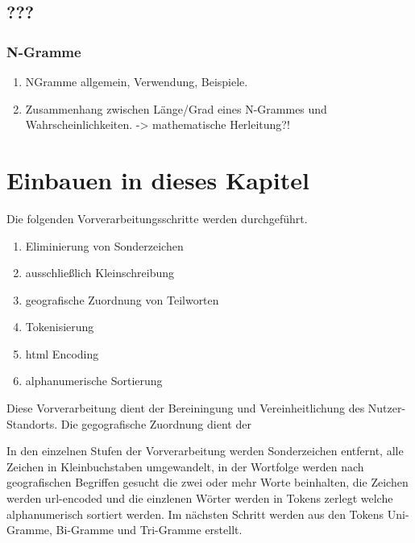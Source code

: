 		\subsubsection{}	

	\subsection{???} 
		\subsubsection{N-Gramme}
			\begin{enumerate}
				\item NGramme allgemein, Verwendung, Beispiele. 
				\item {} Zusammenhang zwischen Länge/Grad eines N-Grammes und Wahrscheinlichkeiten. -> mathematische Herleitung?!
			\end{enumerate}




\section{Einbauen in dieses Kapitel}

Die folgenden Vorverarbeitungsschritte werden durchgeführt.

	\begin{enumerate}
		\item Eliminierung von Sonderzeichen
		\item ausschließlich Kleinschreibung
		\item geografische Zuordnung von Teilworten  	
		\item Tokenisierung
		\item html Encoding
		\item alphanumerische Sortierung 
	\end{enumerate}

	Diese Vorverarbeitung dient der Bereiningung und Vereinheitlichung des Nutzer-Standorts.  
	Die gegografische Zuordnung dient der  

	In den einzelnen Stufen der Vorverarbeitung werden Sonderzeichen entfernt, alle Zeichen in Kleinbuchstaben umgewandelt, in der Wortfolge werden nach geografischen Begriffen gesucht die zwei oder mehr Worte beinhalten, die Zeichen werden url-encoded und die einzlenen Wörter werden in Tokens zerlegt welche alphanumerisch sortiert werden.
	Im nächsten Schritt werden aus den Tokens Uni-Gramme, Bi-Gramme und Tri-Gramme erstellt. 
